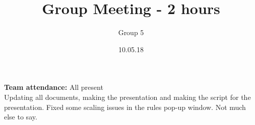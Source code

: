 \documentclass{article}
\title{Group Meeting - 2 hours}
\author{Group 5}
\date{10.05.18}
\begin{document}
	\maketitle
	\noindent
	\textbf{Team attendance:}  All present \\
  \noindent
Updating all documents, making the presentation and making the script for the presentation.
Fixed some scaling issues in the rules pop-up window. Not much else to say. 
\end{document}
